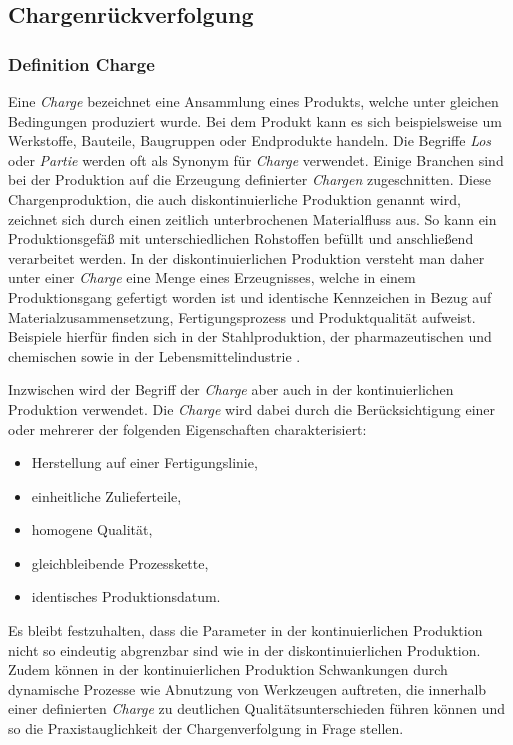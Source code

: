 \subsection{Chargenrückverfolgung} \label{sec:batch-traceability}


\subsubsection{Definition Charge}

Eine \textit{Charge} bezeichnet eine Ansammlung eines Produkts, welche unter gleichen Bedingungen produziert wurde. Bei dem Produkt kann es sich beispielsweise um Werkstoffe, Bauteile, Baugruppen oder Endprodukte handeln. Die Begriffe \textit{Los} oder \textit{Partie} werden oft als Synonym für \textit{Charge} verwendet. Einige Branchen sind bei der Produktion auf die Erzeugung definierter \textit{Chargen} zugeschnitten. Diese Chargenproduktion, die auch diskontinuierliche Produktion genannt wird, zeichnet sich durch einen zeitlich unterbrochenen Materialfluss aus. So kann ein Produktionsgefäß mit unterschiedlichen Rohstoffen befüllt und anschließend verarbeitet werden. In der diskontinuierlichen Produktion versteht man daher unter einer \textit{Charge} eine Menge eines Erzeugnisses, welche in einem Produktionsgang gefertigt worden ist und identische Kennzeichen in Bezug auf Materialzusammensetzung, Fertigungsprozess und Produktqualität aufweist. Beispiele hierfür finden sich in der Stahlproduktion, der pharmazeutischen und chemischen sowie in der Lebensmittelindustrie \citep{Guenther2012}.

Inzwischen wird der Begriff der \textit{Charge} aber auch in der kontinuierlichen Produktion verwendet. Die \textit{Charge} wird dabei durch die Berücksichtigung einer oder mehrerer der folgenden Eigenschaften charakterisiert:

\begin{itemize}
  \item Herstellung auf einer Fertigungslinie,
  \item einheitliche Zulieferteile,
  \item homogene Qualität,
  \item gleichbleibende Prozesskette,
  \item identisches Produktionsdatum.
\end{itemize}

Es bleibt festzuhalten, dass die Parameter in der kontinuierlichen Produktion nicht so eindeutig abgrenzbar sind wie in der diskontinuierlichen Produktion. Zudem können in der kontinuierlichen Produktion Schwankungen durch dynamische Prozesse wie Abnutzung von Werkzeugen auftreten, die innerhalb einer definierten \textit{Charge} zu deutlichen Qualitätsunterschieden führen können und so die Praxistauglichkeit der Chargenverfolgung in Frage stellen.

